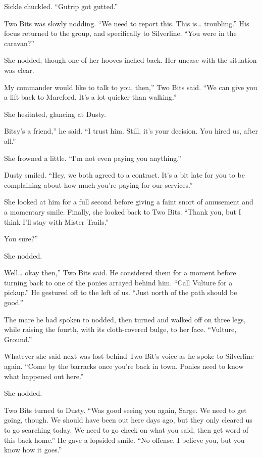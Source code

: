 Sickle chuckled. “Gutrip got gutted.”

Two Bits was slowly nodding. “We need to report this. This is… troubling.” His focus returned to the group, and specifically to Silverline. “You were in the caravan?”

She nodded, though one of her hooves inched back. Her unease with the situation was clear.

\leavevmode{}My commander would like to talk to you, then,” Two Bits said. “We can give you a lift back to Mareford. It’s a lot quicker than walking.”

She hesitated, glancing at Dusty.

\leavevmode{}Bitsy’s a friend,” he said. “I trust him. Still, it’s your decision. You hired us, after all.”

She frowned a little. “I’m not even paying you anything.”

Dusty smiled. “Hey, we both agreed to a contract. It’s a bit late for you to be complaining about how much you’re paying for our services.”

She looked at him for a full second before giving a faint snort of amusement and a momentary smile. Finally, she looked back to Two Bits. “Thank you, but I think I’ll stay with Mister Trails.”

\leavevmode{}You sure?”

She nodded.

\leavevmode{}Well… okay then,” Two Bits said. He considered them for a moment before turning back to one of the ponies arrayed behind him. “Call Vulture for a pickup.” He gestured off to the left of us. “Just north of the path should be good.”

The mare he had spoken to nodded, then turned and walked off on three legs, while raising the fourth, with its cloth-covered bulge, to her face. “Vulture, Ground.”

Whatever she said next was lost behind Two Bit’s voice as he spoke to Silverline again. “Come by the barracks once you’re back in town. Ponies need to know what happened out here.”

She nodded.

Two Bits turned to Dusty. “Was good seeing you again, Sarge. We need to get going, though. We should have been out here days ago, but they only cleared us to go searching today. We need to go check on what you said, then get word of this back home.” He gave a lopsided smile. “No offense. I believe you, but you know how it goes.”

